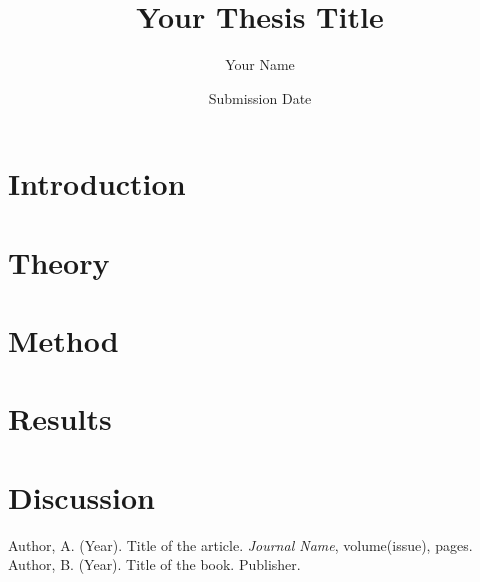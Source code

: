 \documentclass[12pt]{report}
\title{Your Thesis Title}
\author{Your Name}
\date{Submission Date}
\begin{document}
\maketitle

\begin{abstract}
\lipsum[1] %
\end{abstract}

\tableofcontents

\chapter{Introduction}
\lipsum[2-3] %

\chapter{Theory}
\lipsum[4-6] %

\chapter{Method}
\lipsum[7-9] %

\chapter{Results}
\lipsum[10-12] %

\chapter{Discussion}
\lipsum[13-15] %

\begin{thebibliography}{99}
 Author, A. (Year). Title of the article. \emph{Journal Name}, volume(issue), pages.
 Author, B. (Year). Title of the book. Publisher.
\end{thebibliography}
\end{document}
